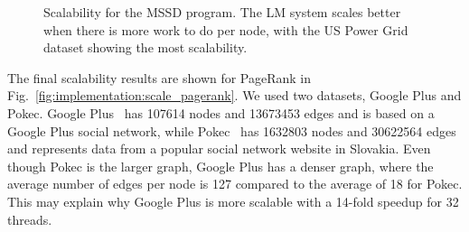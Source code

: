 \begin{figure}[]
        \caption{Scalability for the MSSD program. The LM system scales better
        when there is more work to do per node, with the US Power Grid dataset
        showing the most scalability.}

        \label{fig:implementation:scale_sssp}
\end{figure}

The final scalability results are shown for PageRank in
Fig.~\ref{fig:implementation:scale_pagerank}. We used two datasets, Google Plus
and Pokec. Google Plus~\cite{snapnets} has 107614 nodes and 13673453 edges and is based on a Google Plus social network, while Pokec~\cite{snapnets} has
1632803 nodes and 30622564 edges and represents data from a popular social network website in Slovakia.
Even though Pokec is the larger graph, Google
Plus has a denser graph, where the average number of edges per node is 127
compared to the average of 18 for Pokec. This may explain why Google Plus is
more scalable with a 14-fold speedup for 32 threads.

